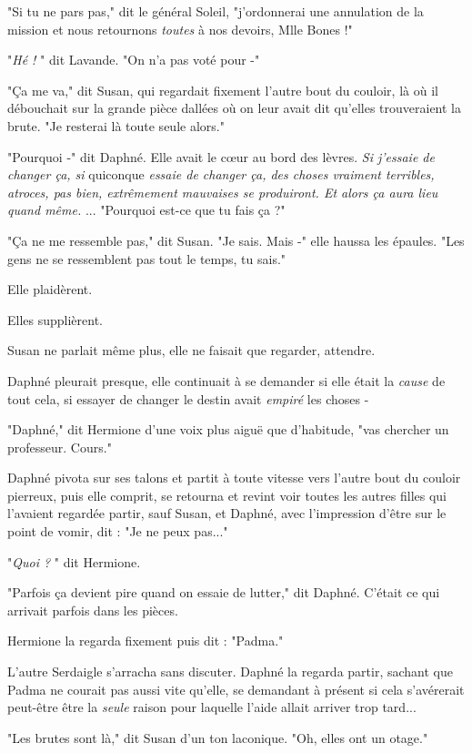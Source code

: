 "Si tu ne pars pas," dit le général Soleil, "j'ordonnerai une annulation de la mission et nous retournons \emph{toutes}  à nos devoirs, Mlle Bones !"

"\emph{Hé !} " dit Lavande. "On n'a pas voté pour -"

"Ça me va," dit Susan, qui regardait fixement l'autre bout du couloir, là où il débouchait sur la grande pièce dallées où on leur avait dit qu'elles trouveraient la brute. "Je resterai là toute seule alors."

"Pourquoi -" dit Daphné. Elle avait le cœur au bord des lèvres. \emph{Si j'essaie de changer ça, si } quiconque \emph{essaie de changer ça, des choses vraiment terribles, atroces, pas bien, extrêmement mauvaises se produiront. Et alors ça aura lieu quand même.} ... "Pourquoi est-ce que tu fais ça ?"

"Ça ne me ressemble pas," dit Susan. "Je sais. Mais -" elle haussa les épaules. "Les gens ne se ressemblent pas tout le temps, tu sais."

Elle plaidèrent.

Elles supplièrent.

Susan ne parlait même plus, elle ne faisait que regarder, attendre.

Daphné pleurait presque, elle continuait à se demander si elle était la \emph{cause}  de tout cela, si essayer de changer le destin avait \emph{empiré } les choses -

"Daphné," dit Hermione d'une voix plus aiguë que d'habitude, "vas chercher un professeur. Cours."

Daphné pivota sur ses talons et partit à toute vitesse vers l'autre bout du couloir pierreux, puis elle comprit, se retourna et revint voir toutes les autres filles qui l'avaient regardée partir, sauf Susan, et Daphné, avec l'impression d'être sur le point de vomir, dit : "Je ne peux pas..."

"\emph{Quoi ?} " dit Hermione.

"Parfois ça devient pire quand on essaie de lutter," dit Daphné. C'était ce qui arrivait parfois dans les pièces.

Hermione la regarda fixement puis dit : "Padma."

L'autre Serdaigle s'arracha sans discuter. Daphné la regarda partir, sachant que Padma ne courait pas aussi vite qu'elle, se demandant à présent si cela s'avérerait peut-être être la \emph{seule}  raison pour laquelle l'aide allait arriver trop tard...

"Les brutes sont là," dit Susan d'un ton laconique. "Oh, elles ont un otage."

